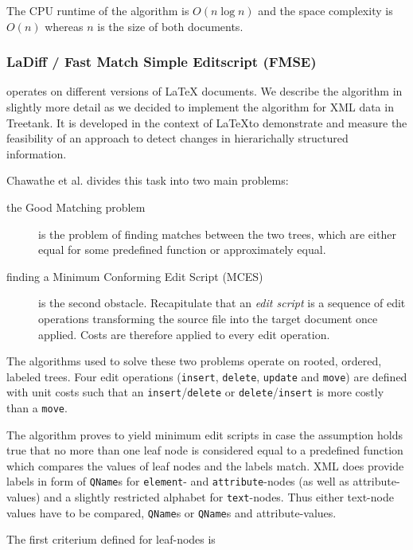 The CPU runtime of the algorithm is $O(n \log n)$ and the space complexity is $O(n)$ whereas $n$ is the size of both documents.

\subsubsection{LaDiff / Fast Match Simple Editscript (FMSE)\cite{chawathe1996change}}\label{subsec::ladiff}
operates on different versions of LaTeX documents. We describe the algorithm in slightly more detail as we decided to implement the algorithm for XML data in Treetank. It is developed in the context of \LaTeX to demonstrate and measure the feasibility of an approach to detect changes in hierarichally structured information. 

Chawathe et al. divides this task into two main problems:

\begin{description}
\item[the Good Matching problem] is the problem of finding matches between the two trees, which are either equal for some predefined function or approximately equal.
\item[finding a Minimum Conforming Edit Script (MCES)] is the second obstacle. Recapitulate that an \emph{edit script} is a sequence of edit operations transforming the source file into the target document once applied. Costs are therefore applied to every edit operation.
\end{description}

The algorithms used to solve these two problems operate on rooted, ordered, labeled trees. Four edit operations (\texttt{insert}, \texttt{delete}, \texttt{update} and \texttt{move}) are defined with unit costs such that an \texttt{insert}/\texttt{delete} or \texttt{delete}/\texttt{insert} is more costly than a \texttt{move}.

The algorithm proves to yield minimum edit scripts in case the assumption holds true that no more than one leaf node is considered equal to a predefined function which compares the values of leaf nodes and the labels match. XML does provide labels in form of \texttt{QName}s for \texttt{element}- and \texttt{attribute}-nodes (as well as attribute-values) and a slightly restricted alphabet for \texttt{text}-nodes. Thus either text-node values have to be compared, \texttt{QName}s or \texttt{QName}s and attribute-values.

The first criterium defined for leaf-nodes is 

